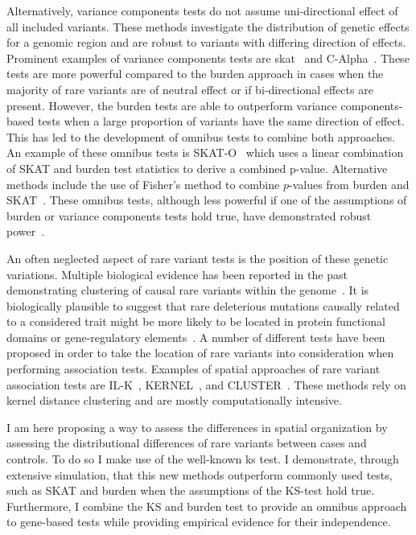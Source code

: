 Alternatively, variance components tests do not assume uni-directional effect of all included variants. 
These methods investigate the distribution of genetic effects for a genomic region and are robust to variants with differing direction of effects.
Prominent examples of variance components tests are \acrfull{skat}~\cite{Wu2011} and C-Alpha~\cite{Neale2011}.
These tests are more powerful compared to the burden approach in cases when the majority of rare variants are of neutral effect or if bi-directional effects are present.
However, the burden tests are able to outperform variance components-based tests when a large proportion of variants have the same direction of effect.
This has led to the development of omnibus tests to combine both approaches.
An example of these omnibus tests is SKAT-O~\cite{Lee2012a} which uses a linear combination of SKAT and burden test statistics to derive a combined p-value.
Alternative methods include the use of Fisher's method to combine $p$-values from burden and SKAT~\cite{Derkach2013a}.
These omnibus tests, although less powerful if one of the assumptions of burden or variance components tests hold true, have demonstrated robust power~\cite{Lee2014}. 

An often neglected aspect of rare variant tests is the position of these genetic variations.
Multiple biological evidence has been reported in the past demonstrating clustering of causal rare variants within the genome~\cite{Ionita-Laza2012, Raab2010,Schaid2013,Fier2012}.
It is biologically plausible to suggest that rare deleterious mutations causally related to a considered trait might be more likely to be located in protein functional domains or gene-regulatory elements~\cite{Fier2012}.
A number of different tests have been proposed in order to take the location of rare variants into consideration when performing association tests.
Examples of spatial approaches of rare variant association tests are IL-K~\cite{Ionita-Laza2012}, KERNEL~\cite{Schaid2013}, and CLUSTER~\cite{Lin2014}.
These methods rely on kernel distance clustering and are mostly computationally intensive.

I am here proposing a way to assess the differences in spatial organization by assessing the distributional differences of rare variants between cases and controls.
To do so I make use of the well-known \acrfull{ks} test.
I demonstrate, through extensive simulation, that this new methods outperform commonly used tests, such as SKAT and burden when the assumptions of the KS-test hold true.
Furthermore, I combine the KS and burden test to provide an omnibus approach to gene-based tests while providing empirical evidence for their independence.
